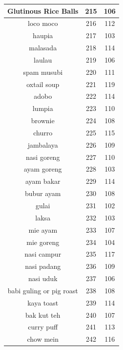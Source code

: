 {\begin{longtable}{| c | c | c|}
        \hline
        Glutinous Rice Balls  &  215  &  106  \\
        \hline
        loco moco  &  216  &  112  \\
        \hline
        haupia  &  217  &  103  \\
        \hline
        malasada  &  218  &  114  \\
        \hline
        laulau  &  219  &  106  \\
        \hline
        spam musubi  &  220  &  111  \\
        \hline
        oxtail soup  &  221  &  119  \\
        \hline
        adobo  &  222  &  114  \\
        \hline
        lumpia  &  223  &  110  \\
        \hline
        brownie  &  224  &  108  \\
        \hline
        churro  &  225  &  115  \\
        \hline
        jambalaya  &  226  &  109  \\
        \hline
        nasi goreng  &  227  &  110  \\
        \hline
        ayam goreng  &  228  &  103  \\
        \hline
        ayam bakar  &  229  &  114  \\
        \hline
        bubur ayam  &  230  &  108  \\
        \hline
        gulai  &  231  &  102  \\
        \hline
        laksa  &  232  &  103  \\
        \hline
        mie ayam  &  233  &  107  \\
        \hline
        mie goreng  &  234  &  104  \\
        \hline
        nasi campur  &  235  &  117  \\
        \hline
        nasi padang  &  236  &  109  \\
        \hline
        nasi uduk  &  237  &  106  \\
        \hline
        babi guling or pig roast  &  238  &  108  \\
        \hline
        kaya toast  &  239  &  114  \\
        \hline
        bak kut teh  &  240  &  107  \\
        \hline
        curry puff  &  241  &  113  \\
        \hline
        chow mein  &  242  &  116  \\

\end{longtable}}
